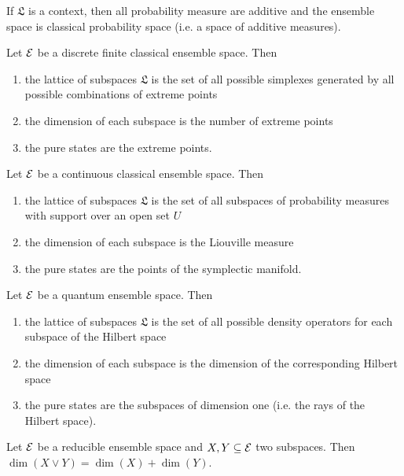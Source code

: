 \begin{conj}
	If $\mathfrak{L}$ is a context, then all probability measure are additive and the ensemble space is classical probability space (i.e. a space of additive measures).
\end{conj}


\begin{conj}
	Let $\mathcal{E}$ be a discrete finite classical ensemble space. Then
	\begin{enumerate}
		\item the lattice of subspaces $\mathfrak{L}$ is the set of all possible simplexes generated by all possible combinations of extreme points
		\item the dimension of each subspace is the number of extreme points
		\item the pure states are the extreme points.
	\end{enumerate}
\end{conj}

\begin{conj}
	Let $\mathcal{E}$ be a continuous classical ensemble space. Then
	\begin{enumerate}
		\item the lattice of subspaces $\mathfrak{L}$ is the set of all subspaces of probability measures with support over an open set $U$
		\item the dimension of each subspace is the Liouville measure
		\item the pure states are the points of the symplectic manifold.
	\end{enumerate}
\end{conj}

\begin{conj}
	Let $\mathcal{E}$ be a quantum ensemble space. Then
	\begin{enumerate}
		\item the lattice of subspaces $\mathfrak{L}$ is the set of all possible density operators for each subspace of the Hilbert space
		\item the dimension of each subspace is the dimension of the corresponding Hilbert space
		\item the pure states are the subspaces of dimension one (i.e. the rays of the Hilbert space).
	\end{enumerate}
\end{conj}

\begin{conj}
	Let $\mathcal{E}$ be a reducible ensemble space and $X,Y \subseteq{\mathcal{E}}$ two subspaces. Then $\dim(X \vee Y) = \dim(X) + \dim(Y)$.
\end{conj}


